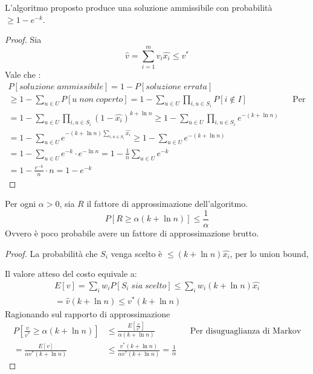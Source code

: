 \begin{theorem}
    \label{setth}
    L'algoritmo proposto produce una soluzione ammissibile con probabilità $\geq 1 - e^{-k}$.
\end{theorem}
\begin{proof}
    Sia $$\hat{v} = \sum_{i = 1}^{m} v_i\hat{x_i} \leq v^*$$
    Vale che : 
    \begin{equation}
        \begin{aligned}
            P[\mathit{soluzione \; ammissibile}] = 1 - P[\mathit{soluzione\;errata}] \\
            \geq 1 - \sum_{u \in U} P[\mathit{u \; non \; coperto}] = 1 - \sum_{u \in U} \prod_{i,u\in S_i}P[i \notin I]&& \text{Per union bound}\\
            = 1 - \sum_{u \in U} \prod_{i,u\in S_i}(1 - \hat{x_i})^{k+\ln n}\geq
            1 - \sum_{u \in U} \prod_{i,u\in S_i}e^{-(k+\ln n)}\\
            = 1 - \sum_{u \in U}e^{-(k+\ln n)\sum_{i,u\in S_i}\hat{x_i}} \geq 
            1 - \sum_{u \in U}e^{-(k+\ln n)}\\
            = 1 - \sum_{u \in U}e^{-k}\cdot e^{-\ln n} = 1 - \frac{1}{n}\sum_{u \in U}e^{-k}\\
            = 1 - \frac{e^{-k}}{n} \cdot n = 1 - e^{-k}
        \end{aligned}
    \end{equation}
\end{proof}
\begin{theorem}
    \label{setth2}
    Per ogni $\alpha > 0$, sia $R$ il fattore di approssimazione dell'algoritmo.
    $$P[R \geq \alpha(k + \ln n)] \leq \frac{1}{\alpha}$$
    Ovvero è poco probabile avere un fattore di approssimazione brutto.
\end{theorem}
\begin{proof}
    La probabilità che $S_i$ venga scelto è $\leq (k + \ln n)\hat{x_i}$, per lo union bound, 
    
    Il valore atteso del costo equivale a:
    \begin{equation}
        \begin{aligned}
            E[v] = \sum_i w_i P[S_i\;\mathit{sia \;scelto}] \leq \sum_i w_i(k + \ln n)\hat{x_i}\\
            = \hat{v}(k + \ln n) \leq v^*(k + \ln n)
        \end{aligned}
    \end{equation}
    Ragionando sul rapporto di approssimazione
    \begin{equation}
        \begin{aligned}
            P[\frac{v}{v^*}\geq \alpha(k +\ln n)] &\leq \frac{E[\frac{v}{v^*}]}{\alpha(k + \ln n)} && \text{Per disuguaglianza di Markov}\\
            = \frac{E[v]}{\alpha v^* (k + \ln n)} &\leq \frac{v^* (k + \ln n)}{\alpha v^* (k + \ln n)} = \frac{1}{\alpha}
        \end{aligned}
    \end{equation}
\end{proof}
